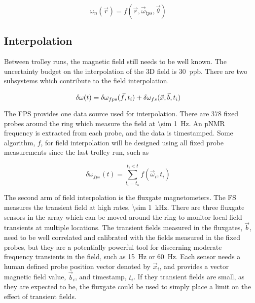 \begin{equation}
\label{eqn:field-3d-trolley}
\omega_{n}(\vec{r}) = f(\vec{r}, \vec{\omega}_{tps}, \vec{\theta})
\end{equation}

\subsection{Interpolation}

Between trolley runs, the magnetic field still needs to be well known.  The uncertainty budget on the interpolation of the 3D field is \SI{30}{ppb}.  There are two subsystems which contribute to the field interpolation.

\begin{equation}
\label{eqn:field-interpolation}
\delta \omega(t) = \delta \omega_{fps}(\vec{f}, t_i) \\
+ \delta \omega_{fs}(\vec{x}, \vec{b}, t_i)
\end{equation}

The FPS provides one data source used for interpolation.  There are 378 fixed probes around the ring which measure the field at \SI{\sim 1}{\Hz}.  An pNMR frequency is extracted from each probe, and the data is timestamped.  Some algorithm, $f$, for field interpolation will be designed using all fixed probe measurements since the last trolley run, such as

\begin{equation}
\label{eqn:field-interpolation-fps}
\delta \omega_{fps}(t) = \sum_{t_i = t_n}^{t_i < t} f(\vec{\omega}_i, t_i)
\end{equation}

The second arm of field interpolation is the fluxgate magnetometers.  The FS measures the transient field at high rates, \SI{\sim 1}{\kHz}.  There are three fluxgate sensors in the array which can be moved around the ring to monitor local field transients at multiple locations.  The transient fields measured in the fluxgates, $\vec{b}$, need to be well correlated and calibrated with the fields measured in the fixed probes, but they are a potentially powerful tool for discerning moderate frequency transients in the field, such as \SI{15}{\Hz} or \SI{60}{\Hz}.  Each sensor needs a human defined probe position vector denoted by $\vec{x}_i$, and provides a vector magnetic field value, $\vec{b}_i$, and timestamp, $t_i$.  If they transient fields are small, as they are expected to be, the fluxgate could be used to simply place a limit on the effect of transient fields.

